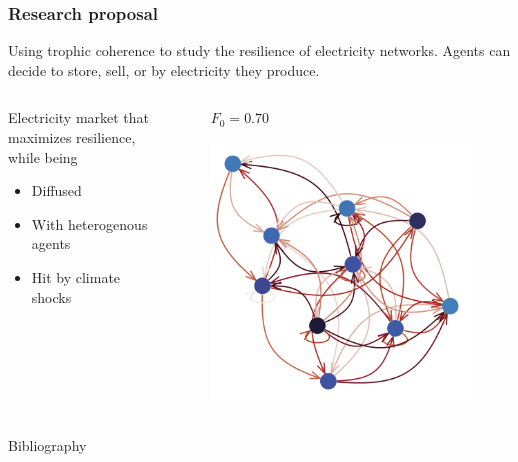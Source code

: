 \documentclass{beamer}
\begin{document}
\begin{frame}
    \frametitle{Research proposal}
    Using trophic coherence to study the resilience of electricity networks. Agents can decide to store, sell, or by electricity they produce.


    \begin{columns}
        \begin{column}{.49\textwidth}
            Electricity market that maximizes resilience, while being
            \begin{itemize}
                \item Diffused
                \item With heterogenous agents
                \item Hit by climate shocks
            \end{itemize}
        \end{column}
        \begin{column}{.49\textwidth}
            \begin{figure}
                \textbf{$F_0 = 0.70$}\par\medskip
                \includegraphics[width=\linewidth,height=0.4\textheight,keepaspectratio]{../../plots/presentations/electricity.png}
            \end{figure}
        \end{column}
    \end{columns}
\end{frame}


\begin{frame}[allowframebreaks]{Bibliography}
    
    
\end{frame}
\end{document}
